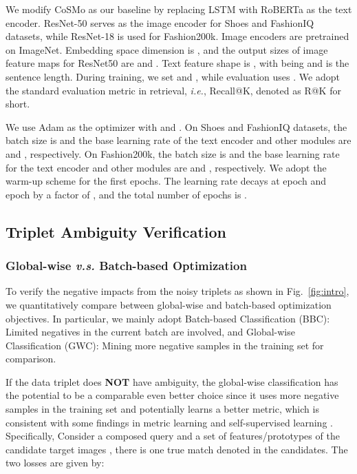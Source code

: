 \documentclass[sigconf]{acmart}
\def\ie{\emph{i.e.}}
\begin{document}
We modify CoSMo \cite{lee2021cosmo} as our baseline by replacing LSTM \cite{graves2012long} with RoBERTa \cite{liu2019RoBERTa} as the text encoder. ResNet-50 \cite{he2016deep} serves as the image encoder for Shoes and FashionIQ datasets, while ResNet-18 \cite{he2016deep} is used for Fashion200k. Image encoders are pretrained on ImageNet. Embedding space dimension  is , and the output sizes of image feature maps  for ResNet50 are  and . Text feature shape is , with  being  and  is the sentence length. During training, we set  and , while evaluation uses . We adopt the standard evaluation metric in retrieval, \ie, Recall@K, denoted as R@K for short.

We use Adam \cite{kingma2014adam} as the optimizer with  and . On Shoes and FashionIQ datasets, the batch size is  and the base learning rate of the text encoder and other modules are  and , respectively. On Fashion200k, the batch size is  and the base learning rate for the text encoder and other modules are  and , respectively. We adopt the warm-up scheme for the first  epochs. The learning rate decays at epoch  and epoch  by a factor of , and the total number of epochs is . 

\subsection{Triplet Ambiguity Verification}
\label{subsec:ambiguity}

\subsubsection{Global-wise \emph{v.s.} Batch-based Optimization}

To verify the negative impacts from the noisy triplets as shown in Fig.~\ref{fig:intro}, we quantitatively compare between global-wise and batch-based optimization objectives. In particular, we mainly adopt  Batch-based Classification (BBC): Limited negatives in the current batch are involved, and  Global-wise Classification (GWC): Mining more negative samples in the training set for comparison.

If the data triplet does \textbf{NOT} have ambiguity, the global-wise classification has the potential to be a comparable even better choice since it uses more negative samples in the training set and potentially learns a better metric, which is consistent with some findings in metric learning \cite{hermans2017defense,sheng2020mining,wang2020cross} and self-supervised learning \cite{chen2020simple,he2020momentum}. Specifically, Consider a composed query  and a set of features/prototypes of the candidate target images  , there is one true match denoted  in the candidates. The two losses are given by:
\end{document}
